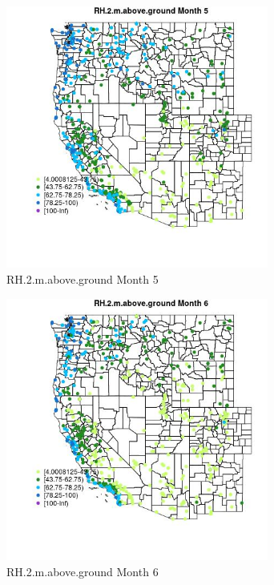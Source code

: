 \begin{figure} 
\centering  
\includegraphics[width=0.77\textwidth]{Code_Outputs/Report_ML_input_PM25_Step4_part_e_de_duplicated_aves_compiled_2019-05-14wNAs_MapObsMo5RH2maboveground.jpg} 
\caption{\label{fig:Report_ML_input_PM25_Step4_part_e_de_duplicated_aves_compiled_2019-05-14wNAsMapObsMo5RH2maboveground}RH.2.m.above.ground Month 5} 
\end{figure} 
 

\begin{figure} 
\centering  
\includegraphics[width=0.77\textwidth]{Code_Outputs/Report_ML_input_PM25_Step4_part_e_de_duplicated_aves_compiled_2019-05-14wNAs_MapObsMo6RH2maboveground.jpg} 
\caption{\label{fig:Report_ML_input_PM25_Step4_part_e_de_duplicated_aves_compiled_2019-05-14wNAsMapObsMo6RH2maboveground}RH.2.m.above.ground Month 6} 
\end{figure} 
 

